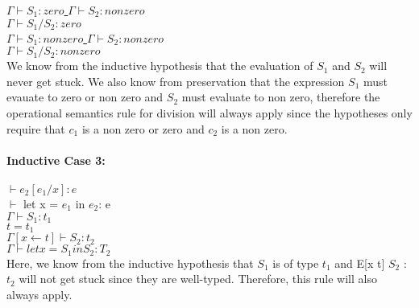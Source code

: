 \documentclass[11pt]{article}
\begin{document}
\begin{enumerate}
\begin{enumerate}
			\underline{$\Gamma\vdash S_1:zero$ \hspace{12} $\Gamma\vdash S_2:non zero$}\\
		$\Gamma\vdash S_1/S_2:zero$\\
		
		\underline{$\Gamma\vdash S_1:non zero$ \hspace{12} $\Gamma\vdash S_2:non zero$}\\
		$\Gamma\vdash S_1/S_2:non zero$\\
		
		We know from the inductive hypothesis that the evaluation of
$S_1$ and $S_2$ will never get stuck. We also know from
preservation that the expression $S_1$ must evauate to zero or non zero and $S_2$ must evaluate to non zero, therefore the operational
semantics rule for division will always apply since the hypotheses
only require that $c_1$ is a non zero or zero and $c_2$ is a non zero.\\
		\\
		\textbf{Inductive Case 3:}\\
		\\
		\underline{$\vdash e_2[e_1/x]:e$}\\
		$\vdash$ let x = $e_1$ in $e_2$: e\\
		
		$\Gamma\vdash S_1: t_1$\\
		$t = t_1$\\
		\underline{$\Gamma[x \leftarrow t]\vdash S_2:t_2$ }\\
		$\Gamma\vdash let x=S_1 in S_2:T_2$\\
		
		Here, we know from the inductive hypothesis that $S_1$ is of type $t_1$ and E[x \leftarrow t] $S_2$ : $t_2$ will not get stuck since they are well-typed. Therefore, this rule will also always apply.\\
		
			
			

\end{enumerate}


\end{enumerate}
\end{document}
